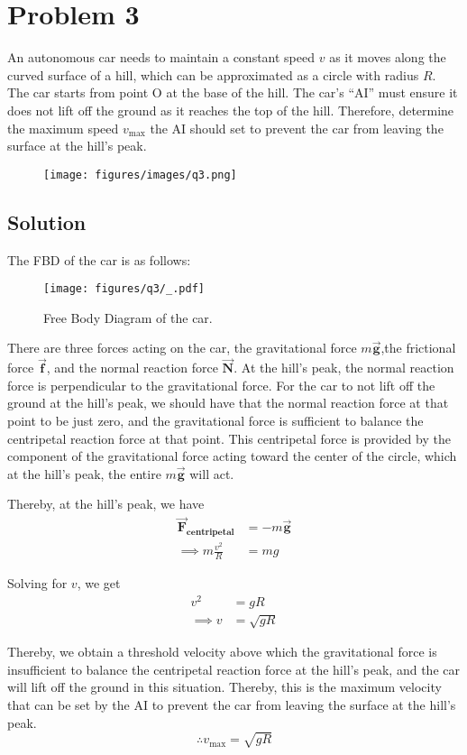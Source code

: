 \section*{Problem 3}

An autonomous car needs to maintain a constant speed \( v \) as it moves along the curved surface of a hill, which can be approximated as a circle with radius \( R \).
The car starts from point O at the base of the hill.
The car's ``AI'' must ensure it does not lift off the ground as it reaches the top of the hill.
Therefore, determine the maximum speed \( v_{\max} \) the AI should set to prevent the car from leaving the surface at the hill's peak.

\begin{figure*}[h]
    \centering
    \texttt{[image: figures/images/q3.png]}
\end{figure*}

\subsection*{Solution}

The FBD of the car is as follows:
\begin{figure*}[h]
    \centering
    \texttt{[image: figures/q3/\_.pdf]}
    \caption{
        Free Body Diagram of the car.
    }
\end{figure*}

There are three forces acting on the car, the gravitational force \( m\vec{\mathbf{g}} \),the frictional force \( \vec{\mathbf{f}} \), and the normal reaction force \( \vec{\mathbf{N}} \).
At the hill's peak, the normal reaction force is perpendicular to the gravitational force.
For the car to not lift off the ground at the hill's peak, we should have that the normal reaction force at that point to be just zero, and the gravitational force is sufficient to balance the centripetal reaction force at that point.
This centripetal force is provided by the component of the gravitational force acting toward the center of the circle, which at the hill's peak, the entire \( m\vec{\mathbf{g}} \) will act.

Thereby, at the hill's peak, we have
\begin{align*}
    \vec{\mathbf{F}}_{\textbf{centripetal}}
     & =
    - m\vec{\mathbf{g}}
    \\ \implies
    m\frac{v^2}{R}
     & =
    mg
\end{align*}

Solving for \( v \), we get
\begin{align*}
    v^2 & = gR        \\
    \implies
    v   & = \sqrt{gR}
\end{align*}

Thereby, we obtain a threshold velocity above which the gravitational force is insufficient to balance the centripetal reaction force at the hill's peak, and the car will lift off the ground in this situation.
Thereby, this is the maximum velocity that can be set by the AI to prevent the car from leaving the surface at the hill's peak.
\[
    \therefore \boxed{v_{\max} = \sqrt{gR}}
\]
